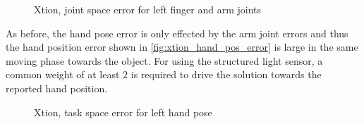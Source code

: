 \begin{figure}[h]
\centering
{}
%
\caption{Xtion, joint space error for left finger and arm joints}
\label{fig:xtion_joint_error}
\end{figure}

As before, the hand pose error is only effected by the arm joint errors and thus the hand position error shown in \cref{fig:xtion_hand_pos_error} is large in the same moving phase towards the object. For using the structured light sensor, a common weight of at least $2$ is required to drive the solution towards the reported hand position.

\begin{figure}[h]
\centering
{}
%
\caption{Xtion, task space error for left hand pose}
\label{fig:xtion_hand_pose_error}
\end{figure}

